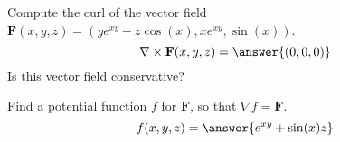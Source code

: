 \begin{problem}
Compute the curl of the vector field $\mathbf{F}(x,y,z) = (ye^{xy}+z\cos(x), xe^{xy},\sin(x))$.
\[
\nabla\times\mathbf{F}(x,y,z) = \answer{(0,0,0)}
\]
Is this vector field conservative?
\begin{multipleChoice}
\end{multipleChoice}
\begin{problem}
Find a potential function $f$ for $\mathbf{F}$, so that $\nabla f = \mathbf{F}$.
\[
f(x,y,z) = \answer{e^{xy}+\sin(x)z}
\]
\end{problem}
\end{problem}